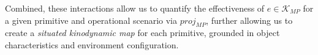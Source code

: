 Combined, these interactions allow us to quantify the effectiveness of $e \in \mathcal{K}_{MP}$ for a given primitive and operational scenario via $proj_{MP}$, further allowing us to create a \textsl{situated kinodynamic map} for each primitive, grounded in object characteristics and environment configuration.


% 


